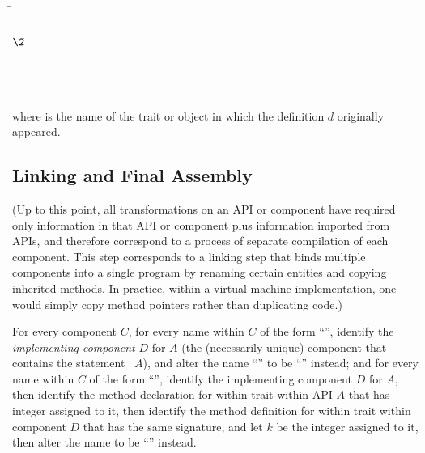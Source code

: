 \begin{codeexamplesize}
\begin{tabbing}
\=\\
\> \\
\(\2\)\= \\
\> \\
\> \\
\> \\
\>
\end{tabbing}
\end{codeexamplesize}
where  is the name of the trait or object in which the definition $d$ originally appeared.

\subsection{Linking and Final Assembly}

(Up to this point, all transformations on an API or component
have required only information in that API or component plus
information imported from APIs, and therefore correspond to a process
of separate compilation of each component.  This step
corresponds to a linking step that binds multiple components
into a single program by renaming certain entities
and copying inherited methods.  In practice, within a virtual machine
implementation, one would simply copy method pointers rather than duplicating code.)

For every component $C$, for every name within $C$ of the form
``'', identify the \emph{implementing component} $D$ for $A$
(the (necessarily unique) component
that contains the statement \hbox{ $A$}), and alter the name
``'' to be ``'' instead;
and for every name within $C$ of the form
``'', identify the implementing component $D$ for $A$,
then identify the method declaration for  within trait  within
API $A$ that has integer  assigned to it,
then identify the method definition for  within trait  within
component $D$ that has the same signature, and let $k$ be the integer assigned to it,
then alter the name to be \hbox{``''} instead.

